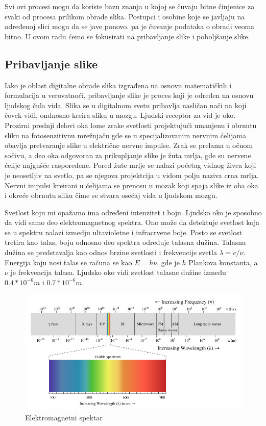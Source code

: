 \documentclass[a4paper,12pt,titlepage]{article}
\begin{document}
Svi ovi procesi mogu da koriste bazu znanja u kojoj se čuvaju bitne činjenice za svaki od procesa prilikom obrade slika. Postupci i osobine koje se javljaju na određenoj slici mogu da se jave ponovo. pa je čuvanje podataka o obradi veoma bitno. U ovom radu ćemo se fokusirati na pribavljanje slike i poboljšanje slike.

\subsection{Pribavljanje slike}%

Iako je oblast digitalne obrade slika izgrađena na osnovu matematičkih i formulacija u verovatnoći, pribavljanje slike je proces koji je određen na osnovu ljudskog čula vida. Slika se u digitalnom svetu pribavlja nasličan nači na koji čovek vidi, ondnosno kreira sliku u mozgu. Ljudski receptor za vid je oko. Prozirni prednji delovi oka lome zrake svetlosti projektujući umanjenu i obrnutu sliku na fotosenzitivnu mrežnjaču gde se u specijalizovanim nervnim ćelijama obavlja pretvaranje slike u električne nervne impulse. Zrak se prelama u očnom sočivu, a deo oka odgovoran za prikupljanje slike je žuta mrlja, gde su nervene ćelije najgušće raspoređene. Pored žute mrlje se nalazi početag vidnog živca koji je neosetljiv na svetlo, pa se njegova projektcija u vidom polju naziva crna mrlja. Nervni impulsi kreirani u ćelijama se prenosu u mozak koji spaja slike iz oba oka i okreće obrnutu sliku čime se stvara osećaj vida u ljudskom mozgu.

Svetlost koju mi opažamo ima određeni intenzitet i boju. Ljudsko oko je sposobno da vidi samo deo elektromagnetnog spektra. Ono može da detektuje svetlost koja se u spektru nalazi izmedju ultavioletne i infracrvene boje. Posto se svetlost tretira kao talas, boju odnosno deo spektra određuje talasna dužina. Talasna dužina se predstavalja kao odnos brzine svetlosti i frekvencije svetla $\lambda = c / \nu$. Energija koju nosi talas se računa se kao $E = h \nu$, gde je $h$ Plankova konstanta, a $\nu$ je frekvencija talasa. Ljudsko oko vidi svetlost talasne dužine između $0.4 * 10^{-6}m$ i $0.7 * 10^{-6}m$.

\begin{figure}[ht!]
\centering
\includegraphics[width=120mm]{img/spektar.png}
\caption{Elektromagnetni spektar}
\label{spektar}
\end{figure} 
\end{document}

